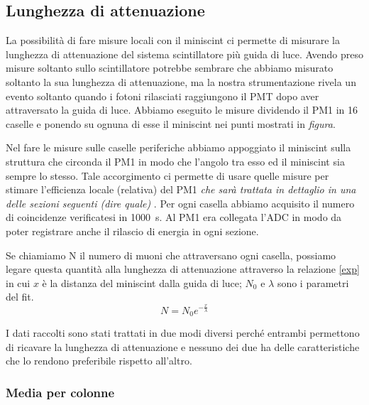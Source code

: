 
\subsection{Lunghezza di attenuazione}

La possibilità di fare misure locali con il miniscint 
ci permette di misurare la lunghezza di attenuazione del sistema scintillatore più guida di luce. Avendo preso misure soltanto sullo scintillatore potrebbe sembrare che abbiamo misurato soltanto la sua lunghezza di attenuazione, ma la nostra strumentazione rivela un evento soltanto quando i fotoni rilasciati raggiungono il PMT dopo aver attraversato la guida di luce. 
Abbiamo eseguito le misure dividendo il PM1 in 16 caselle e ponendo su ognuna di esse il miniscint nei punti mostrati in \emph{figura}. 

Nel fare le misure sulle caselle periferiche abbiamo appoggiato il miniscint sulla struttura che circonda il PM1 in modo che l'angolo tra esso ed il miniscint sia sempre lo stesso. Tale accorgimento ci permette di usare quelle misure per stimare l'efficienza locale (relativa) del PM1 \emph{che sarà trattata in dettaglio in una delle sezioni seguenti  (dire quale) }.                            
Per ogni casella abbiamo acquisito il numero di coincidenze verificatesi in \SI{1000}{s}. Al PM1 era collegata l'ADC in modo da poter registrare anche il rilascio di energia in ogni sezione.

Se chiamiamo N il numero di muoni che attraversano ogni casella, possiamo legare questa quantità alla lunghezza di attenuazione attraverso la relazione \eqref{exp} in cui $x$ è la distanza del miniscint dalla guida di luce; $N_0$ e $\lambda$ sono i parametri del fit. 
\begin{equation}
N=N_0 e^{-\frac{x}{\lambda}}  \label{exp}
\end{equation}

I dati raccolti sono stati trattati in due modi diversi perché entrambi permettono di ricavare la lunghezza di attenuazione e nessuno dei due ha delle caratteristiche che lo rendono preferibile rispetto all'altro.

\subsubsection{Media per colonne}

